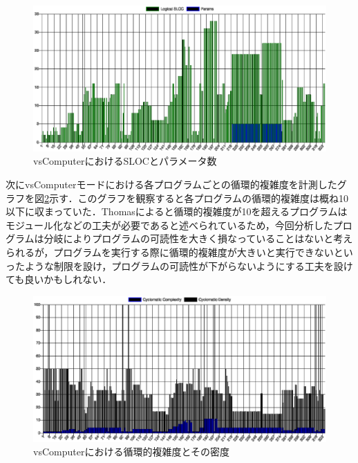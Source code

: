 \begin{itemize}
  \begin{figure}[!ht]
    \begin{center}
      \includegraphics[width=1.0\linewidth]{image/vsComputer_escomplex_SLOC_params.eps}
    \end{center}
      \vspace{-8mm} 
    \caption{vsComputerにおけるSLOCとパラメータ数}
    \label{vsComputer_sloc_and_params}
  \end{figure}

  次にvsComputerモードにおける各プログラムごとの循環的複雑度を計測したグラフを図\ref{vsComputer_cyclomatic_complexity}示す．このグラフを観察すると各プログラムの循環的複雑度は概ね10以下に収まっていた．Thomasによると循環的複雑度が10を超えるプログラムはモジュール化などの工夫が必要であると述べられているため，今回分析したプログラムは分岐によりプログラムの可読性を大きく損なっていることはないと考えられるが，プログラムを実行する際に循環的複雑度が大きいと実行できないといったような制限を設け，プログラムの可読性が下がらないようにする工夫を設けても良いかもしれない．

  \begin{figure}[!ht]
    \begin{center}
      \includegraphics[width=1.0\linewidth]{image/vsComputer_escomplex_complexity.eps}
    \end{center}
      \vspace{-8mm} 
    \caption{vsComputerにおける循環的複雑度とその密度}
    \label{vsComputer_cyclomatic_complexity}
  \end{figure}


\end{itemize}
